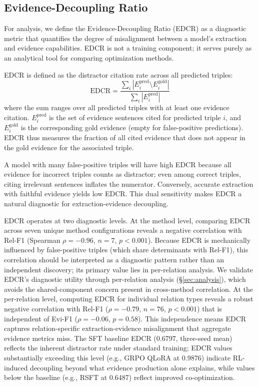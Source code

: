 \subsection{Evidence-Decoupling Ratio}
\label{sec:edcr}

For analysis, we define the Evidence-Decoupling Ratio (EDCR) as a diagnostic metric that quantifies the degree of misalignment between a model's extraction and evidence capabilities. EDCR is not a training component; it serves purely as an analytical tool for comparing optimization methods.

EDCR is defined as the distractor citation rate across all predicted triples:
\begin{equation}
\text{EDCR} = \frac{\sum_{i} |E_i^{\text{pred}} \setminus E_i^{\text{gold}}|}{\sum_{i} |E_i^{\text{pred}}|}
\label{eq:edcr}
\end{equation}
where the sum ranges over all predicted triples with at least one evidence citation. $E_i^{\text{pred}}$ is the set of evidence sentences cited for predicted triple $i$, and $E_i^{\text{gold}}$ is the corresponding gold evidence (empty for false-positive predictions). EDCR thus measures the fraction of all cited evidence that does not appear in the gold evidence for the associated triple.

A model with many false-positive triples will have high EDCR because all evidence for incorrect triples counts as distractor; even among correct triples, citing irrelevant sentences inflates the numerator. Conversely, accurate extraction with faithful evidence yields low EDCR. This dual sensitivity makes EDCR a natural diagnostic for extraction-evidence decoupling.

EDCR operates at two diagnostic levels. At the method level, comparing EDCR across seven unique method configurations reveals a negative correlation with Rel-F1 (Spearman $\rho{=}{-}0.96$, $n{=}7$, $p{<}0.001$). Because EDCR is mechanically influenced by false-positive triples (which share determinants with Rel-F1), this correlation should be interpreted as a diagnostic pattern rather than an independent discovery; its primary value lies in per-relation analysis. We validate EDCR's diagnostic utility through per-relation analysis (\S\ref{sec:analysis}), which avoids the shared-component concern present in cross-method correlation. At the per-relation level, computing EDCR for individual relation types reveals a robust negative correlation with Rel-F1 ($\rho{=}{-}0.79$, $n{=}76$, $p{<}0.001$) that is independent of Evi-F1 ($\rho{=}{-}0.06$, $p{=}0.58$). This independence means EDCR captures relation-specific extraction-evidence misalignment that aggregate evidence metrics miss. The SFT baseline EDCR (0.6797, three-seed mean) reflects the inherent distractor rate under standard training; EDCR values substantially exceeding this level (e.g., GRPO QLoRA at 0.9876) indicate RL-induced decoupling beyond what evidence production alone explains, while values below the baseline (e.g., RSFT at 0.6487) reflect improved co-optimization.
